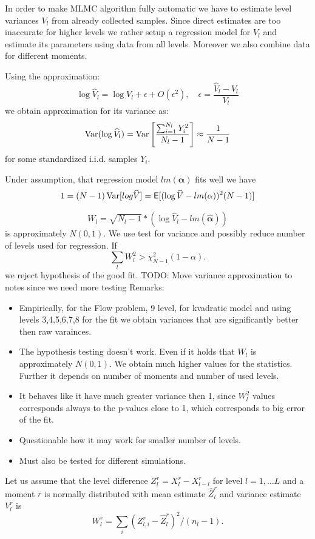 \documentclass{article}
\def\vc#1{\mathbf{\boldsymbol{#1}}}     %
\def \E{{\mathsf E}}
\def\todo#1{{\color{red}TODO: #1}}
\def\Var{\mathop{\rm Var}}
\begin{document}
In order to make MLMC algorithm fully automatic we have to estimate level variances $V_l$ from already collected samples. Since direct estimates are too inaccurate for higher levels we rather setup a regression model for $V_l$ and estimate its parameters using data from all levels. Moreover we also combine data for different moments.


Using the approximation:
\[
 \log \widehat V_l = \log V_l + \epsilon + O(\epsilon^2), \quad \epsilon = \frac{\widehat V_l - V_l}{V_l}
\]
we obtain approximation for its variance as:
\[
   \Var(\log \widehat V_l) = \Var\left[ \frac{\sum_{i=1}^{N_l} Y_i^2}{N_l -1}\right]  \approx \frac{1}{N-1}
\]
for some standardized i.i.d. samples $Y_i$.

Under assumption, that regression model $lm(\vc \alpha)$ fits well we have 
\[
 1 = (N-1) \Var[log \widehat V] = \E[ (\log \widehat V - lm(\alpha))^2 (N-1) ] 
\]


\[
  W_l = \sqrt{N_l-1}*(\log \widehat V_l - lm(\widehat{\vc\alpha}))
\]  
  is approximately $N(0,1)$. We use test for variance and possibly 
reduce number of levels used for regression. If
\[
  \sum_l W_l^2 > \chi^2_{N-1}(1-\alpha). 
\]
we reject hypothesis of the good fit.
\todo{Move variance approximation to notes since we need more testing}
Remarks:
\begin{itemize}
 \item Empirically, for the Flow problem, 9 level, for kvadratic model and using levels 3,4,5,6,7,8 for the fit we obtain variances that are significantly better then raw varainces.
 \item The hypothesis testing doesn't work. Even if it holds that $W_l$ is approximately $N(0,1)$.
 We obtain much higher values for the statistics. Further it depends on number of moments and number of used levels. 
 \item It behaves like it have much greater variance then 1, since $W_l^2$ values corresponds always to the p-values close to 1, which corresponds to big error of the fit.
 \item Questionable how it may work for smaller number of levels.
 \item Must also be tested for different simulations.
\end{itemize}




Let us assume that the level difference $Z_l^r = X_l^r - X^r_{l-l}$ for level $l=1,\dots L$ and a moment $r$ is normally distributed 
with mean estimate $\hat{Z}_l^r$ and variance estimate $V_l^r$ is
$$
W_l^r = \sum_{i} (Z^r_{l,i} - \hat{Z}_l^r)^2 / (n_l - 1).
$$
\end{document}
